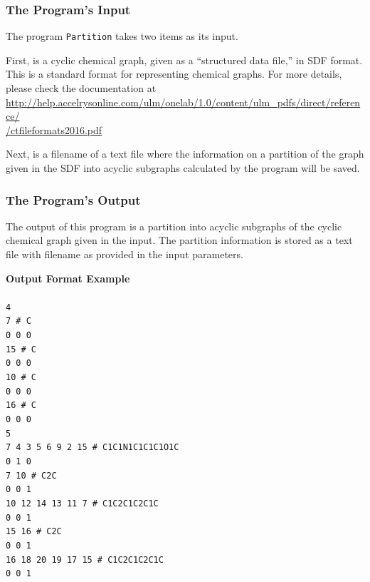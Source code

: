 \documentclass[11pt,titlepage,dvipdfmx,twoside]{book}
\begin{document}
\subsubsection{The Program's Input}
\label{chap:Input_p}


The program {\tt Partition} takes two items as its input.

First, is a cyclic chemical graph, given as a ``structured data file,'' in  SDF format.
This is a standard format for representing chemical graphs.
For more details, please check the documentation at \\
\url{ http://help.accelrysonline.com/ulm/onelab/1.0/content/ulm_pdfs/direct/reference/} \\
\url{/ctfileformats2016.pdf} 

Next,  is a filename of a text file where the information on 
a partition of the graph given in the SDF into acyclic subgraphs
calculated by the program will be saved.


\subsubsection{The Program's Output}
\label{chap:Output_p}

The output of this program is a 
partition into acyclic subgraphs of the cyclic chemical graph given in
the input.
The partition information is stored as a text file with filename as provided
in the input parameters.


\begin{oframed}
{\bf Output Format Example}\\\\
{\tt 4 \\
7 \# C \\
0 0 0 \\
15 \# C \\
0 0 0 \\
10 \# C \\
0 0 0 \\
16 \# C \\
0 0 0 \\
5 \\
7 4 3 5 6 9 2 15 \# C1C1N1C1C1C1O1C \\
0 1 0 \\
7 10 \# C2C \\
0 0 1 \\
10 12 14 13 11 7 \# C1C2C1C2C1C \\
0 0 1 \\
15 16 \# C2C \\
0 0 1 \\
16 18 20 19 17 15 \# C1C2C1C2C1C \\
0 0 1 \\}
\end{oframed}
\end{document}
